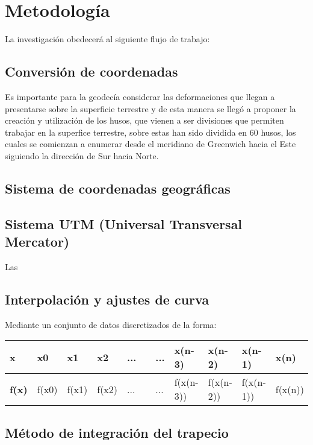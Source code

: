 \documentclass[12pt,a4paper]{report}
\begin{document}
\section{Metodología}

La investigación obedecerá al siguiente flujo de trabajo:

\subsection{Conversión de coordenadas}
Es importante para la geodecía considerar las deformaciones que llegan a presentarse sobre la superficie terrestre y de esta manera se llegó a proponer la creación y utilización de los husos, que vienen a ser divisiones que permiten trabajar en la superfice terrestre, sobre estas han sido dividida en 60 husos, los cuales se comienzan a enumerar desde el meridiano de Greenwich hacia el Este siguiendo la dirección de Sur hacia Norte.

\subsection{Sistema de coordenadas geográficas}



\subsection{Sistema UTM (Universal Transversal Mercator)}
Las 

\subsection{Interpolación y ajustes de curva}
Mediante un conjunto de datos discretizados de la forma:

\begin{table}[h]
\begin{tabular}{|l|l|l|l|l|l|l|l|l|l|l|}
\hline
\textbf{x}    & x0    & x1    & x2    & ... &  & ... & x(n-3)    & x(n-2)    & x(n-1)    & x(n)    \\ \hline
\textbf{f(x)} & f(x0) & f(x1) & f(x2) & ... &  & ... & f(x(n-3)) & f(x(n-2)) & f(x(n-1)) & f(x(n)) \\ \hline
\end{tabular}
\end{table}


\subsection{Método de integración del trapecio}
\end{document}
